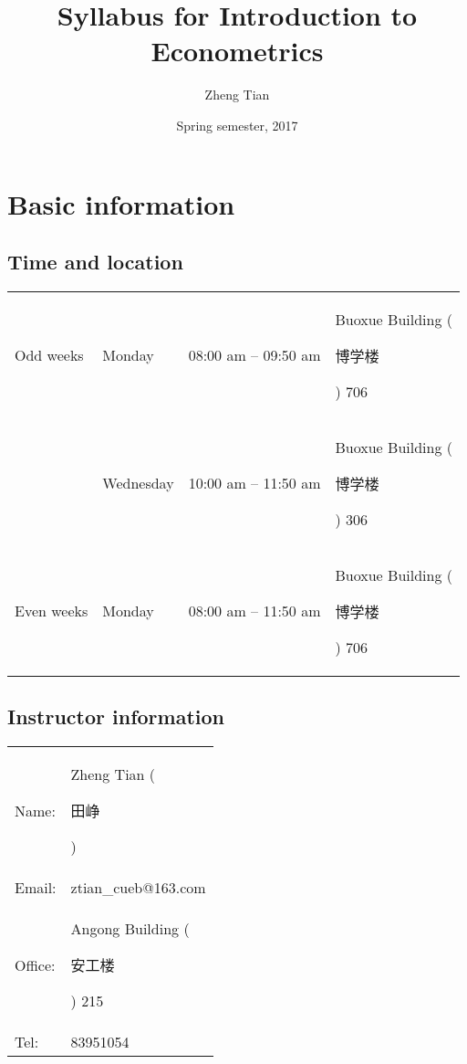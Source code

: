 \documentclass[a4paper,11pt]{article}
\author{Zheng Tian}
\date{Spring semester, 2017}
\title{Syllabus for Introduction to Econometrics}
\begin{document}
\maketitle

\section{Basic information}
\label{sec:orgf8ce1fa}
\subsection*{Time and location}
\label{sec:org0f9e4bf}

\begin{center}
\begin{tabular}{llll}
Odd weeks & Monday & 08:00 am -- 09:50 am & Buoxue Building (\begin{CJK}{UTF8}{gbsn}博学楼\end{CJK}) 706\\
 & Wednesday & 10:00 am -- 11:50 am & Buoxue Building (\begin{CJK}{UTF8}{gbsn}博学楼\end{CJK}) 306\\
Even weeks & Monday & 08:00 am -- 11:50 am & Buoxue Building (\begin{CJK}{UTF8}{gbsn}博学楼\end{CJK}) 706\\
\end{tabular}
\end{center}


\subsection*{Instructor information}
\label{sec:orgc211ace}

\begin{center}
\begin{tabular}{ll}
Name: & Zheng Tian (\begin{CJK}{UTF8}{gbsn}田峥\end{CJK})\\
Email: & ztian\_cueb@163.com\\
Office: & Angong Building (\begin{CJK}{UTF8}{gbsn}安工楼\end{CJK}) 215\\
Tel: & 83951054\\
\end{tabular}
\end{center}
\end{document}
